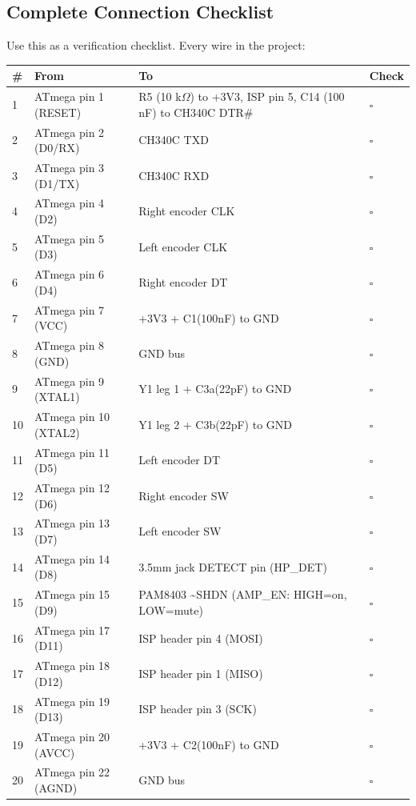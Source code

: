 \documentclass[a4paper,11pt]{article}
\renewcommand*{\,}{ }%
\begin{document}
\subsection{Complete Connection Checklist}

Use this as a verification checklist. Every wire in the project:

\begin{longtable}{@{}p{0.5cm}p{5cm}p{5cm}p{1.5cm}@{}}
\toprule
\textbf{\#} & \textbf{From} & \textbf{To} & \textbf{Check} \\
\midrule
\endhead
1 & ATmega pin 1 (RESET) & R5 (10\,k$\Omega$) to +3V3, ISP pin 5, C14 (100\,nF) to CH340C DTR\# & $\square$ \\
2 & ATmega pin 2 (D0/RX) & CH340C TXD & $\square$ \\
3 & ATmega pin 3 (D1/TX) & CH340C RXD & $\square$ \\
4 & ATmega pin 4 (D2) & Right encoder CLK & $\square$ \\
5 & ATmega pin 5 (D3) & Left encoder CLK & $\square$ \\
6 & ATmega pin 6 (D4) & Right encoder DT & $\square$ \\
7 & ATmega pin 7 (VCC) & +3V3 + C1(100nF) to GND & $\square$ \\
8 & ATmega pin 8 (GND) & GND bus & $\square$ \\
9 & ATmega pin 9 (XTAL1) & Y1 leg 1 + C3a(22pF) to GND & $\square$ \\
10 & ATmega pin 10 (XTAL2) & Y1 leg 2 + C3b(22pF) to GND & $\square$ \\
11 & ATmega pin 11 (D5) & Left encoder DT & $\square$ \\
12 & ATmega pin 12 (D6) & Right encoder SW & $\square$ \\
13 & ATmega pin 13 (D7) & Left encoder SW & $\square$ \\
14 & ATmega pin 14 (D8) & 3.5mm jack DETECT pin (HP\_DET) & $\square$ \\
15 & ATmega pin 15 (D9) & PAM8403 \textasciitilde{}SHDN (AMP\_EN: HIGH=on, LOW=mute) & $\square$ \\
16 & ATmega pin 17 (D11) & ISP header pin 4 (MOSI) & $\square$ \\
17 & ATmega pin 18 (D12) & ISP header pin 1 (MISO) & $\square$ \\
18 & ATmega pin 19 (D13) & ISP header pin 3 (SCK) & $\square$ \\
19 & ATmega pin 20 (AVCC) & +3V3 + C2(100nF) to GND & $\square$ \\
20 & ATmega pin 22 (AGND) & GND bus & $\square$ \\

\end{longtable}
\end{document}
